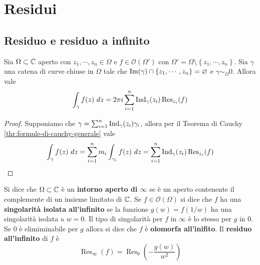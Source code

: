 \def \Res {\operatorname{Res}}

\chapter{Residui}

\section{Residuo e residuo a infinito}

\begin{theorem}
  Sia $\Omega \subset \mathbb{C}$ aperto con $z_1, \cdots, z_n \in \Omega$ e $f \in
  \mathcal{O}(\Omega')$ con $\Omega' = \Omega \setminus \left\{ z_1,\cdots, z_n
  \right\}$. Sia $\gamma$ una catena di curve chiuse in $\Omega$ tale che
  $\operatorname{Im}(\gamma) \cap \left\{ z_1, \cdots,z_n \right\} = \varnothing$ e $\gamma
  \sim_\Omega 0$. Allora vale 
  \begin{equation*}
    \int_\gamma f(z)\ dz = 2 \pi i \sum_{i=1}^{n} \Ind_\gamma(z_i)
    \Res_{z_i}(f)
  \end{equation*}
  \label{thr:teorema_dei_residui}
\end{theorem}
\begin{proof}
  Supponiamo che $\gamma = \sum_{i=1}^n \operatorname{Ind}_\gamma (z_i) \gamma_i$, allora
  per il Teorema di Cauchy \ref{thr:formule-di-cauchy-generale} vale 
  \begin{equation*}
    \int_\gamma f(z) \ dz = \sum_{i = 1}^{n} m_i \int_{\gamma_i} f(z) \ dz
    = \sum_{i=1}^n \Ind_\gamma(z_i) \Res_{z_i}(f)
  \end{equation*}
\end{proof}

\begin{definition}
  Si dice che $\Omega \subset \mathbb{C}$ è un \textbf{intorno aperto di $\infty$} se
  è un aperto contenente il complemente di un insieme limitato di $\mathbb{C}$. Se $f
  \in \mathcal{O}(\Omega)$ si dice che $f$ ha una \textbf{singolarità isolata
  all'infinito} se la funzione $g(w) = f(1/w)$ ha una singolarità isolata a $w
  = 0$. Il tipo di singolarità per $f$ in $\infty$ è lo stesso per $g$ in $0$.
  Se $0$ è elimiminabile per $g$ allora si dice che $f$ è \textbf{olomorfa
  all'inifito}. Il \textbf{residuo all'infinito} di $f$ è 
  \begin{equation*}
    \Res_\infty(f) = \Res_0\left( -\frac{g(w)}{w^2} \right)
  \end{equation*}
  \label{def:varie_definizioni_all'inifinito}
\end{definition}

